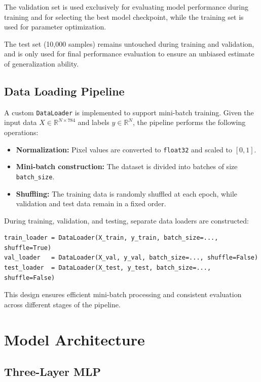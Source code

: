 \documentclass[11pt]{article}
\begin{document}
The validation set is used exclusively for evaluating model performance during training and for selecting the best model checkpoint, while the training set is used for parameter optimization.

The test set (10,000 samples) remains untouched during training and validation, and is only used for final performance evaluation to ensure an unbiased estimate of generalization ability.

\subsection{Data Loading Pipeline}

A custom \texttt{DataLoader} is implemented to support mini-batch training. Given the input data $X \in \mathbb{R}^{N \times 784}$ and labels $y \in \mathbb{R}^{N}$, the pipeline performs the following operations:

\begin{itemize}
    \item \textbf{Normalization:} Pixel values are converted to \texttt{float32} and scaled to $[0, 1]$.
    \item \textbf{Mini-batch construction:} The dataset is divided into batches of size \texttt{batch\_size}.
    \item \textbf{Shuffling:} The training data is randomly shuffled at each epoch, while validation and test data remain in a fixed order.
\end{itemize}

During training, validation, and testing, separate data loaders are constructed:
\begin{verbatim}
train_loader = DataLoader(X_train, y_train, batch_size=..., shuffle=True)
val_loader   = DataLoader(X_val, y_val, batch_size=..., shuffle=False)
test_loader  = DataLoader(X_test, y_test, batch_size=..., shuffle=False)
\end{verbatim}

This design ensures efficient mini-batch processing and consistent evaluation across different stages of the pipeline.

\section{Model Architecture}

\subsection{Three-Layer MLP}
\end{document}
